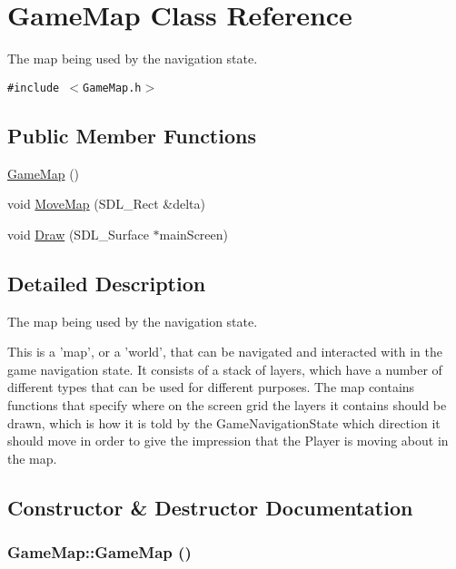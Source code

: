 \hypertarget{class_game_map}{
\section{GameMap Class Reference}
\label{d4/de2/class_game_map}
}
The map being used by the navigation state.  


{\tt \#include $<$GameMap.h$>$}

\subsection*{Public Member Functions}
\begin{CompactItemize}
\item 
\hyperlink{class_game_map_ae71e5694cf19612fcaa4c1e21b03b71}{GameMap} ()
\item 
void \hyperlink{class_game_map_f353eaa95b9b0f7744ad8aa6a6d31158}{MoveMap} (SDL\_\-Rect \&delta)
\item 
void \hyperlink{class_game_map_bde2fbb121a24223a62ab45e3366b4e3}{Draw} (SDL\_\-Surface $\ast$mainScreen)
\end{CompactItemize}


\subsection{Detailed Description}
The map being used by the navigation state. 

This is a 'map', or a 'world', that can be navigated and interacted with in the game navigation state. It consists of a stack of layers, which have a number of different types that can be used for different purposes. The map contains functions that specify where on the screen grid the layers it contains should be drawn, which is how it is told by the GameNavigationState which direction it should move in order to give the impression that the Player is moving about in the map. 

\subsection{Constructor \& Destructor Documentation}
\hypertarget{class_game_map_ae71e5694cf19612fcaa4c1e21b03b71}{
\subsubsection[{GameMap}]{\setlength{\rightskip}{0pt plus 5cm}GameMap::GameMap ()}}
\label{d4/de2/class_game_map_ae71e5694cf19612fcaa4c1e21b03b71}




